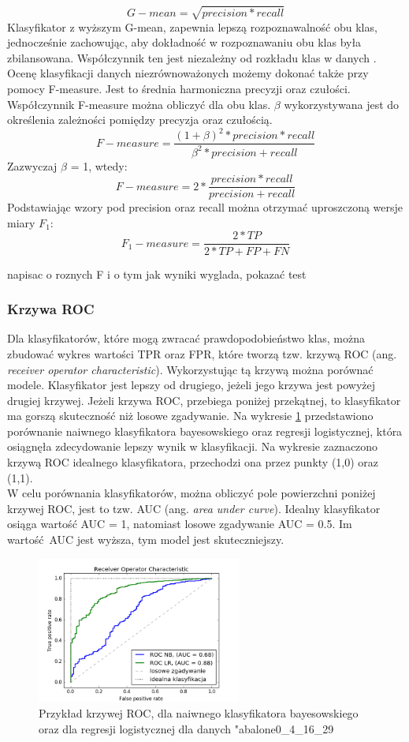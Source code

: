\[G-mean = \sqrt{precision*recall}\]
Klasyfikator z wyższym G-mean, zapewnia lepszą rozpoznawalność obu klas, jednocześnie zachowując, aby dokładność w rozpoznawaniu obu klas była zbilansowana. Współczynnik ten jest niezależny od rozkładu klas w danych \cite{Garcia}.
\\
Ocenę klasyfikacji danych niezrównoważonych możemy dokonać także przy pomocy F-measure. Jest to średnia harmoniczna precyzji oraz czułości. Współczynnik F-measure można obliczyć dla obu klas. $\beta$ wykorzystywana jest do określenia zależności pomiędzy precyzja oraz czułością.
\[F-measure= \frac{(1+\beta)^2*precision*recall}{\beta^2*precision+recall}\]
Zazwyczaj $\beta$ = 1, wtedy:
\[F-measure= 2*\frac{precision*recall}{precision+recall}\]
Podstawiając wzory pod precision oraz recall można otrzymać uproszczoną wersje miary $F_1$:
\[F_1-measure= \frac{2*TP}{2*TP+FP+FN}\]

 napisac o roznych F i o tym jak wyniki wyglada, pokazać test

\subsubsection{Krzywa ROC}
Dla klasyfikatorów, które mogą zwracać prawdopodobieństwo klas, można zbudować wykres wartości TPR oraz FPR, które tworzą tzw. krzywą ROC (ang. \textit{receiver operator characteristic}). Wykorzystując tą krzywą można porównać modele. Klasyfikator jest lepszy od drugiego, jeżeli jego krzywa jest powyżej drugiej krzywej. Jeżeli krzywa ROC, przebiega poniżej przekątnej, to klasyfikator ma gorszą skuteczność niż losowe zgadywanie. Na wykresie \ref{fig:krzywa_roc} przedstawiono porównanie naiwnego klasyfikatora bayesowskiego oraz regresji logistycznej, która osiągnęła zdecydowanie lepszy wynik w klasyfikacji. Na wykresie zaznaczono krzywą ROC idealnego klasyfikatora, przechodzi ona przez punkty (1,0) oraz (1,1).\\
W celu porównania klasyfikatorów, można obliczyć pole powierzchni poniżej krzywej ROC, jest to tzw. AUC (ang. \textit{area under curve}). Idealny klasyfikator osiąga wartość AUC = 1, natomiast losowe zgadywanie AUC = 0.5. Im wartość AUC jest wyższa, tym model jest skuteczniejszy.
\begin{figure}[h]
	\centering
	\includegraphics[width=0.6\textwidth]{./images/roc.png}
	\caption{Przykład krzywej ROC, dla naiwnego klasyfikatora bayesowskiego oraz dla regresji logistycznej dla danych "abalone0\_4\_16\_29}
	\label{fig:krzywa_roc}
\end{figure}

